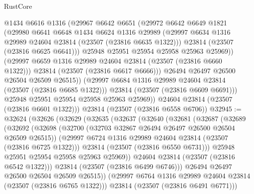 \begin{lexlean}{RustCore}
\begin{coremodule}
                  @1434
                  @6616
                  @1316
                  (@29967
                    @6642
                    @6651
                    (@29972
                      @6642
                      @6649
                      @1821
                      (@29980
                        @6641
                        @6648
                        @1434
                        @6624
                        @1316
                        @29989
                        (@29997 @6634 @1316 @29989 @24604 @23814 (@23507 (@23816 @6635 @1322)))
                        @23814
                        (@23507 (@23816 @6625 @6641)))
                      @25948
                      @25951
                      @25954
                      @25958
                      @25963
                      @25969))
                  (@29997 @6659 @1316 @29989 @24604 @23814 (@23507 (@23816 @6660 @1322)))
                  @23814
                  (@23507 (@23816 @6617 @6666)))
                @26494
                @26497
                @26500
                @26504
                @26509
                @26515))
            (@29997 @6684 @1316 @29989 @24604 @23814 (@23507 (@23816 @6685 @1322)))
            @23814
            (@23507 (@23816 @6609 @6691)))
          @25948
          @25951
          @25954
          @25958
          @25963
          @25969))
      @24604
      @23814
      (@23507 (@23816 @6601 @1322)))
    @23814
    (@23507 (@23816 @6558 @6706))
@32945 := @32624
    (@32626
      (@32629
        (@32635
          (@32637
            (@32640
              (@32681
                (@32687
                  (@32689
                    (@32692
                      (@32698
                        (@32700 (@32703 @32867 @26494 @26497 @26500 @26504 @26509 @26515))
                        (@29997 @6724 @1316 @29989 @24604 @23814 (@23507 (@23816 @6725 @1322)))
                        @23814
                        (@23507 (@23816 @6550 @6731)))
                      @25948
                      @25951
                      @25954
                      @25958
                      @25963
                      @25969))
                  @24604
                  @23814
                  (@23507 (@23816 @6542 @1322)))
                @23814
                (@23507 (@23816 @6499 @6746)))
              @26494
              @26497
              @26500
              @26504
              @26509
              @26515))
          (@29997 @6764 @1316 @29989 @24604 @23814 (@23507 (@23816 @6765 @1322)))
          @23814
          (@23507 (@23816 @6491 @6771)))

\end{coremodule}
\end{lexlean}
